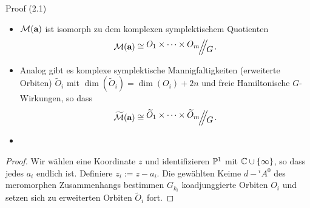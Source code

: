 \begin{ex}
Proof (2.1)
\end{ex}
\begin{prop}
\begin{itemize}
\item
{}
$\mathcal M(\textbf a)$ ist isomorph zu dem komplexen symplektischem Quotienten
\[
\mathcal M(\textbf a)\cong\symplquot{O_1\times\dots\times O_m}{G} \,.
\]
\item
{}
Analog gibt es komplexe symplektische Mannigfaltigkeiten (erweiterte Orbiten)
$\tilde O_i$ mit $\dim(\tilde O_i)=\dim(O_i)+2n$ und freie Hamiltonische
$G$-Wirkungen, so dass
\[
\widetilde{\mathcal M}(\textbf a)\cong
\symplquot{\tilde O_1\times\dots\times\tilde O_m}{G} \,.
\]
\item \TODO[Unterpunkt 3]
\end{itemize}
\end{prop}
\begin{proof}
Wir wählen eine Koordinate $z$ und identifizieren $\P^1$ mit
$\C\cup\{\infty\}$, so dass jedes $a_i$ endlich ist.
Definiere $z_i:=z-a_i$.
Die gewählten Keime $d-{}^iA^0$ des meromorphen Zusammenhangs bestimmen
$G_{k_i}$ koadjunggierte Orbiten $O_i$ und setzen sich zu erweiterten Orbiten
$\tilde O_i$ fort.
\begin{comment}
Setze $O_i$ als den koadjunggierten Orbit durch den Punkt von $\mathfrak
g_k^*$, welcher durch den Hauptteil von ${}^iA^0$ \comm{~in (5)~} gegeben ist.
Analog bestimmt der irreguläre Teil von ${}^iA^0$ einen Punkt in $\mathfrak
b_{k_i}^*$ und $\tilde O_i$ ist der erwieterte Orbit assoziiert zu dem
$B_{k_i}$ koadjunggierten Orbit durch den Punkt
\end{comment}
\end{proof}

